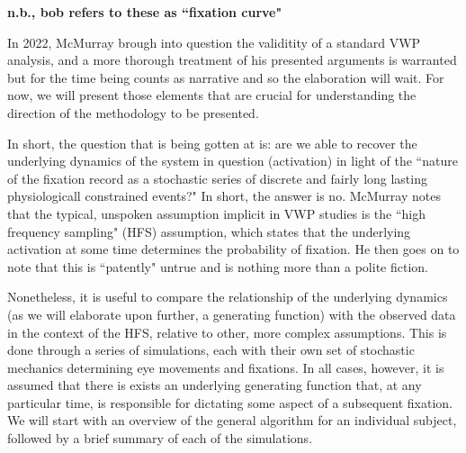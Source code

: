 \documentclass{article}
\begin{document}
\textbf{n.b., bob refers to these as ``fixation curve"}

In 2022, McMurray brough into question the validitity of a standard VWP analysis, and a more thorough treatment of his presented arguments is warranted but for the time being counts as narrative and so the elaboration will wait. For now, we will present those elements that are crucial for understanding the direction of the methodology to be presented.

In short, the question that is being gotten at is: are we able to recover the underlying dynamics of the system in question (activation) in light of the ``nature of the fixation record as a stochastic series of discrete and fairly long lasting physiologicall constrained events?" In short, the answer is no. McMurray notes that the typical, unspoken assumption implicit in VWP studies is the ``high frequency sampling" (HFS) assumption, which states that the underlying activation at some time determines the probability of fixation. He then goes on to note that this is ``patently" untrue and is nothing more than a polite fiction.

Nonetheless, it is useful to compare the relationship of the underlying dynamics (as we will elaborate upon further, a generating function) with the observed data in the context of the HFS, relative to other, more complex assumptions. This is done through a series of simulations, each with their own set of stochastic mechanics determining eye movements and fixations. In all cases, however, it is assumed that there is exists an underlying generating function that, at any particular time, is responsible for dictating some aspect of a subsequent fixation. We will start with an overview of the general algorithm for an individual subject, followed by a brief summary of each of the simulations.
\end{document}
